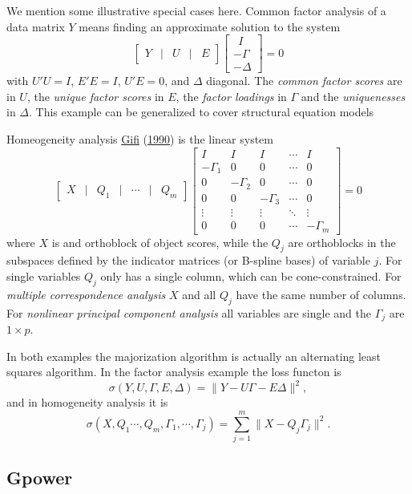 \documentclass[
  12pt,
]{book}
\begin{document}
We mention some illustrative special cases here. Common factor analysis of a data matrix \(Y\) means finding an approximate solution to the system
\[
\begin{bmatrix}
Y&\mid&U&\mid&E
\end{bmatrix}
\begin{bmatrix}
\ \ I\\
-\Gamma\\
-\Delta
\end{bmatrix} = 0
\]
with \(U'U=I\), \(E'E=I\), \(U'E=0\), and \(\Delta\) diagonal. The \emph{common factor scores} are in \(U\), the \emph{unique factor scores} in \(E\), the \emph{factor loadings} in \(\Gamma\) and the \emph{uniquenesses} in \(\Delta\). This example can be generalized to cover structural equation models

Homeogeneity analysis \protect\hyperlink{ref-gifi_B_90}{Gifi} (\protect\hyperlink{ref-gifi_B_90}{1990}) is the linear system
\[
\begin{bmatrix}
X&\mid&Q_1&\mid&\cdots&\mid&Q_m
\end{bmatrix}
\begin{bmatrix}
I&I&I&\cdots&I\\
-\Gamma_1&0&0&\cdots&0\\
0&-\Gamma_2&0&\cdots&0\\
0&0&-\Gamma_3&\cdots&0\\
\vdots&\vdots&\vdots&\ddots&\vdots\\
0&0&0&\cdots&-\Gamma_m
\end{bmatrix}=0
\]
where \(X\) is and orthoblock of object scores, while the \(Q_j\) are orthoblocks in the subspaces defined by the indicator matrices (or B-spline bases) of variable \(j\). For single variables \(Q_j\) only has a single column, which can be cone-constrained. For \emph{multiple correspondence analysis} \(X\) and all \(Q_j\) have the same number of columns. For \emph{nonlinear principal component analysis} all variables are single and the \(\Gamma_j\) are \(1\times p\).

In both examples the majorization algorithm is actually an alternating least squares algorithm. In the factor analysis example the loss functon is
\[
\sigma(Y,U,\Gamma,E,\Delta)=\|Y-U\Gamma-E\Delta\|^2,
\]
and in homogeneity analysis it is
\[
\sigma(X,Q_1\cdots,Q_m,\Gamma_1,\cdots,\Gamma_j)=\sum_{j=1}^m\|X-Q_j\Gamma_j\|^2.
\]

\hypertarget{gpower}{%
\subsection{Gpower}\label{gpower}}
\end{document}
